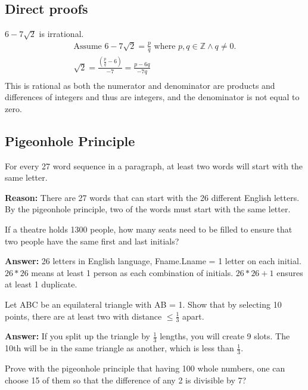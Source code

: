 \documentclass[landscape, letterpaper, 8pt]{extarticle}
\begin{document}
\begin{multicols}{3}
    \subsection*{Direct proofs}
    \begin{example}
        $6-7\sqrt{2}$ is irrational.
        \begin{align*}
            \text{Assume } 6-7\sqrt{2} = \frac{p}{q} \text{ where } p, q \in \mathbb{Z} \land q \not = 0. \\
            \sqrt{2} = \frac{\left(\frac{p}{q}-6\right)}{-7} = \frac{p-6q}{-7q}                           \\
        \end{align*}
        This is rational as both the numerator and denominator are products and differences of integers and thus are integers, and the denominator is not equal to zero.
    \end{example}
    \subsection*{Pigeonhole Principle}
    \begin{example}
        For every 27 word sequence in a paragraph, at least two words will start with the same letter.

        \textbf{Reason: } There are 27 words that can start with the 26 different English letters. By the pigeonhole principle, two of the words must start with the same letter.
    \end{example}
    \begin{example}
        If a theatre holds 1300 people, how many seats need to be filled to ensure that two people have the same first and last initials?

        \textbf{Answer: } 26 letters in English language, Fname.Lname = 1 letter on each initial. $26 * 26$ means at least 1 person as each combination of initials. $26 * 26 +1$ ensures at least 1 duplicate.
    \end{example}
    \begin{example}
        Let ABC be an equilateral triangle with AB = 1. Show that by selecting 10 points, there are at least two with distance $\leq \frac{1}{3}$ apart.

        \textbf{Answer: } If you split up the triangle by $\frac{1}{3}$ lengths, you will create 9 slots. The 10th will be in the same triangle as another, which is less than $\frac{1}{3}$.
    \end{example}
    \begin{example}
        Prove with the pigeonhole principle that having 100 whole numbers, one can choose 15 of them so that the difference of any 2 is divisible by 7?


\end{example}
\end{multicols}
\end{document}
